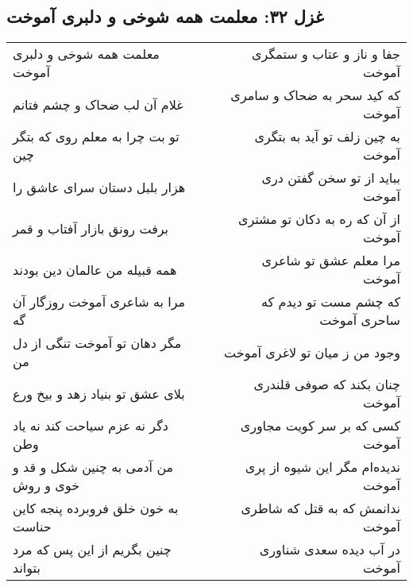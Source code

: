 \begin{center}
\section*{غزل ۳۲: معلمت همه شوخی و دلبری آموخت}
\label{sec:032}
\begin{longtable}{l p{0.5cm} r}
معلمت همه شوخی و دلبری آموخت
&&
جفا و ناز و عتاب و ستمگری آموخت
\\
غلام آن لب ضحاک و چشم فتانم
&&
که کید سحر به ضحاک و سامری آموخت
\\
تو بت چرا به معلم روی که بتگر چین
&&
به چین زلف تو آید به بتگری آموخت
\\
هزار بلبل دستان سرای عاشق را
&&
بباید از تو سخن گفتن دری آموخت
\\
برفت رونق بازار آفتاب و قمر
&&
از آن که ره به دکان تو مشتری آموخت
\\
همه قبیله من عالمان دین بودند
&&
مرا معلم عشق تو شاعری آموخت
\\
مرا به شاعری آموخت روزگار آن گه
&&
که چشم مست تو دیدم که ساحری آموخت
\\
مگر دهان تو آموخت تنگی از دل من
&&
وجود من ز میان تو لاغری آموخت
\\
بلای عشق تو بنیاد زهد و بیخ ورع
&&
چنان بکند که صوفی قلندری آموخت
\\
دگر نه عزم سیاحت کند نه یاد وطن
&&
کسی که بر سر کویت مجاوری آموخت
\\
من آدمی به چنین شکل و قد و خوی و روش
&&
ندیده‌ام مگر این شیوه از پری آموخت
\\
به خون خلق فروبرده پنجه کاین حناست
&&
ندانمش که به قتل که شاطری آموخت
\\
چنین بگریم از این پس که مرد بتواند
&&
در آب دیده سعدی شناوری آموخت
\\
\end{longtable}
\end{center}
